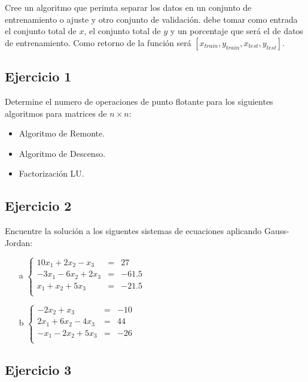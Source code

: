 \documentclass[a4paper,11pt]{article}
\theoremstyle{mytheor}
\begin{document}
\begin{enumerate}[label=\Roman*]
Cree un algoritmo que perimta separar los datos en un conjunto de entrenamiento o ajuste y otro conjunto de validación. debe tomar como entrada el conjunto total de $x$, el conjunto total de $y$ y un porcentaje  que será el de datos de entrenamiento. Como retorno de la función será $[x_{train},y_{train},x_{test},y_{test}]$.



\end{enumerate}

\subsection*{Ejercicio 1}
Determine el numero de operaciones de punto flotante para los siguientes algoritmos para matrices de $n\times	n$:
\begin{itemize}
\item Algoritmo de Remonte.
\item Algoritmo de Descenso.
\item Factorización LU.
\end{itemize}

\subsection*{Ejercicio 2}
Encuentre la solución a los siguentes sistemas de ecuaciones aplicando Gauss-Jordan:

\begin{itemize}
\item[a] $\left\lbrace \begin{array}{ccc}
10x_1 +2x_2 -x_3 & = & 27 \\
-3x_1 -6x_2 +2x_3 & = & -61.5 \\
x_1 +x_2 +5x_3 & = & -21.5 \\
\end{array} \right.$ 
\item[b] $\left\lbrace \begin{array}{ccc}
-2x_2 +x_3 & = & -10 \\
2x_1 +6x_2 -4x_3 & = & 44 \\
-x_1 -2x_2 +5x_3 & = & -26 \\
\end{array} \right.$
\end{itemize}


\subsection*{Ejercicio 3}
\end{document}
